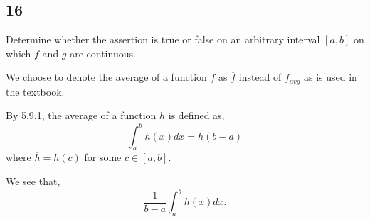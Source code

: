 \documentclass[../hw6.tex]{subfiles}
\begin{document}
\subsection*{16}
Determine whether the assertion is true or false on an arbitrary interval $[a,b]$ on which $f$ and $g$ are continuous.

We choose to denote the average of a function $f$ as $\overline{f}$ instead of $f_{avg}$ as is used in the textbook.


\begin{definition}
    By 5.9.1, the average of a function $h$ is defined as, 
    \[\int_{a}^{b} h(x) dx = \overline{h}(b-a)\]
    where $\overline{h}=h(c)$ for some $c \in [a,b]$.
    
    We see that, \[\frac{1}{b-a} \int_{a}^{b} h(x) dx.\]    
\end{definition}
\end{document}
